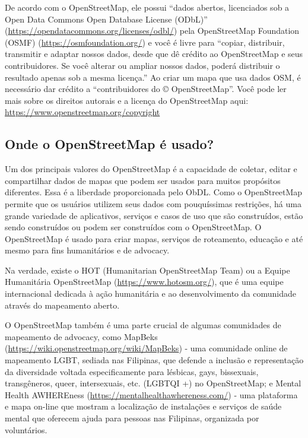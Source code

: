 \documentclass[
  portuguese,
]{krantz}
\begin{document}
De acordo com o OpenStreetMap, ele possui ``dados abertos, licenciados sob a Open Data Commons Open Database License (ODbL)'' (\url{https://opendatacommons.org/licenses/odbl/}) pela OpenStreetMap Foundation (OSMF) (\url{https://osmfoundation.org/}) e você é livre para ``copiar, distribuir, transmitir e adaptar nossos dados, desde que dê crédito ao OpenStreetMap e seus contribuidores. Se você alterar ou ampliar nossos dados, poderá distribuir o resultado apenas sob a mesma licença.'' Ao criar um mapa que usa dados OSM, é necessário dar crédito a ``contribuidores do © OpenStreetMap''. Você pode ler mais sobre os direitos autorais e a licença do OpenStreetMap aqui: \url{https://www.openstreetmap.org/copyright}

\hypertarget{onde-o-openstreetmap-uxe9-usado}{%
\subsection{\texorpdfstring{\textbf{Onde o OpenStreetMap é usado?}}{Onde o OpenStreetMap é usado?}}\label{onde-o-openstreetmap-uxe9-usado}}

Um dos principais valores do OpenStreetMap é a capacidade de coletar, editar e compartilhar dados de mapas que podem ser usados para muitos propósitos diferentes. Essa é a liberdade proporcionada pelo ObDL. Como o OpenStreetMap permite que os usuários utilizem seus dados com pouquíssimas restrições, há uma grande variedade de aplicativos, serviços e casos de uso que são construídos, estão sendo construídos ou podem ser construídos com o OpenStreetMap. O OpenStreetMap é usado para criar mapas, serviços de roteamento, educação e até mesmo para fins humanitários e de advocacy.

Na verdade, existe o HOT (Humanitarian OpenStreetMap Team) ou a Equipe Humanitária OpenStreetMap (\url{https://www.hotosm.org/}), que é uma equipe internacional dedicada à ação humanitária e ao desenvolvimento da comunidade através do mapeamento aberto.

O OpenStreetMap também é uma parte crucial de algumas comunidades de mapeamento de advocacy, como MapBeks (\url{https://wiki.openstreetmap.org/wiki/MapBeks}) - uma comunidade online de mapeamento LGBT, sediada nas Filipinas, que defende a inclusão e representação da diversidade voltada especificamente para lésbicas, gays, bissexuais, transgêneros, queer, intersexuais, etc. (LGBTQI +) no OpenStreetMap; e Mental Health AWHEREness (\url{https://mentalhealthawhereness.com/}) - uma plataforma e mapa on-line que mostram a localização de instalações e serviços de saúde mental que oferecem ajuda para pessoas nas Filipinas, organizada por voluntários.
\end{document}
